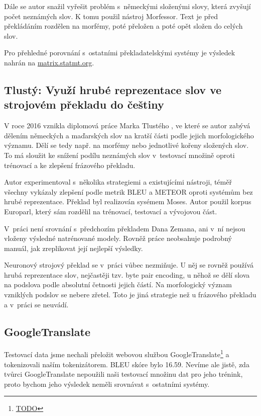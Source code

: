 \documentclass[a4]{article}
\def\furl#1{\footnote{\url{#1}}}
\begin{document}
Dále se autor snažil vyřešit problém s~německými složenými slovy, která
zvyšují počet neznámých slov. K tomu použil nástroj
Morfessor\cite{morfessor}. Text je před překládáním rozdělen na morfémy,
poté přeložen a poté opět složen do celých slov.


Pro přehledné porovnání s~ostatními překladatelskými systémy je výsledek
nahrán na \url{matrix.statmt.org}.

\subsection{Tlustý: Využí hrubé reprezentace slov ve strojovém
překladu do češtiny}

V roce 2016 vznikla diplomová práce Marka Tlustého \cite{tlusty}, ve které se autor
zabývá dělením německých a maďarských slov na kratší části podle jejich
morfologického významu. Dělí se tedy např. na morfémy nebo jednotlivé kořeny
složených slov. To má sloužit ke snížení podílu neznámých slov v~testovací
množině oproti trénovací a ke zlepšení frázového překladu. 

Autor experimentoval s~několika strategiemi a existujícími nástroji, téměř
všechny vykázaly zlepšení podle metrik BLEU a METEOR oproti systémům bez
hrubé reprezentace.  Překlad byl realizován sysémem Moses. Autor použil
korpus Europarl\cite{europarl}, který sám rozdělil na trénovací, testovací a vývojovou
část. 

V~práci není srovnání s~předchozím překladem Dana Zemana, ani v~ní nejsou
vloženy výsledné natrénované modely. Rovněž práce neobsahuje podrobný manuál, jak
zreplikovat její nejlepší výsledky.

Neuronový strojový překlad se v~práci vůbec nezmiňuje. 
U něj se rovněž používá hrubá reprezentace slov, nejčastěji
tzv. byte pair encoding, u něhož se dělí slova na podslova podle absolutní četnosti jejich
částí. Na morfologický význam vzniklých podslov se nebere zřetel. Toto je
jiná strategie než u frázového překladu a v~práci se neuvádí. 


\subsection{GoogleTranslate}


Testovací data jsme nechali přeložit webovou službou
GoogleTranslate\furl{TODO} a tokenizovali naším tokenizátorem. BLEU skóre
bylo 16.59. Nevíme ale jistě, zda tvůrci GoogleTranslate nepoužili naši
testovací množinu dat pro jeho trénink, proto bychom jeho výsledek neměli
srovnávat s~ostatními systémy.
\end{document}
